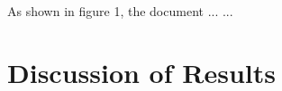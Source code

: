 \documentclass[sigconf]{acmart}
\begin{document}


As shown in figure 1, the document ... ... 


\section{Discussion of Results}






\end{document}
